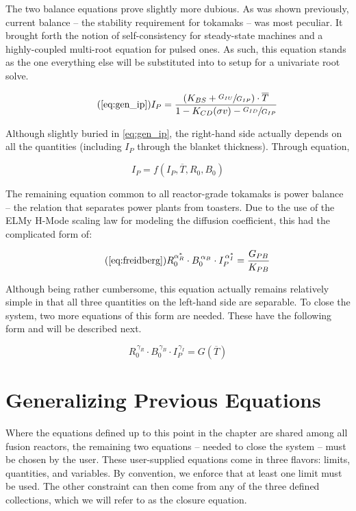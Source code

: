 The two balance equations prove slightly more dubious. As was shown previously, current balance -- the stability requirement for tokamaks -- was most peculiar. It brought forth the notion of self-consistency for steady-state machines and a highly-coupled multi-root equation for pulsed ones. As such, this equation stands as the one everything else will be substituted into to setup for a univariate root solve.

\begin{equation}
	\tag{\ref{eq:gen_ip}}
	I_P = \frac{ \left( K_{BS} + \sfrac{ G_{IU} }{ G_{IP} } \right) \cdot \overline T }{ 1 - K_{CD} ( \sigma v ) - \sfrac{ G_{ID} }{ G_{IP} } }
\end{equation}

Although slightly buried in \cref{eq:gen_ip}, the right-hand side actually depends on all the quantities (including $I_P$ through the blanket thickness). Through equation,

\begin{equation}
	I_P = f(I_P, \overline T, R_0, B_0)
\end{equation}

The remaining equation common to all reactor-grade tokamaks is power balance -- the relation that separates power plants from toasters. Due to the use of the ELMy H-Mode scaling law for modeling the diffusion coefficient, this had the complicated form of:

\begin{equation}
	\tag{\ref{eq:freidberg}}
	R_0^{ \alpha_R^* } \cdot B_0^{\,\alpha_B} \cdot I_P^{\,\alpha_I^*} = \frac{ G_{PB} }{ K_{PB} }
\end{equation}

Although being rather cumbersome, this equation actually remains relatively simple in that all three quantities on the left-hand side are separable. To close the system, two more equations of this form are needed. These have the following form and will be described next.

\begin{equation}
	\label{eq:rbi}
	R_0^{\, \gamma_R} \cdot B_0^{\, \gamma_B} \cdot I_P^{\, \gamma_I} = G( \overline T )
\end{equation}

\section{Generalizing Previous Equations}

Where the equations defined up to this point in the chapter are shared among all fusion reactors, the remaining two equations -- needed to close the system -- must be chosen by the user. These user-supplied equations come in three flavors: limits,  quantities, and  variables. By convention, we enforce that at least one limit must be used. The other constraint can then come from any of the three defined collections, which we will refer to as the closure equation.


